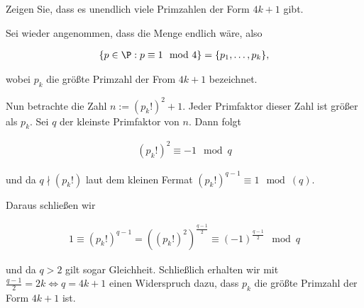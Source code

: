 
\begin{exercise}

Zeigen Sie, dass es unendlich viele Primzahlen der Form $4k+1$ gibt.

\end{exercise}


\begin{solution}

Sei wieder angenommen, dass die Menge endlich wäre, also

\begin{align*}
    \{p \in \P: p \equiv 1 \mod{4}\} = \{p_1,\dots,p_k\},
\end{align*}

wobei $p_k$ die größte Primzahl der From $4k+1$ bezeichnet.

Nun betrachte die Zahl $n := (p_k!)^2 + 1$. Jeder Primfaktor dieser Zahl ist
größer als $p_k$. Sei $q$ der kleinste Primfaktor von $n$. Dann folgt

\begin{align*}
    (p_k!)^2 \equiv -1 \mod{q}
\end{align*}

und da $q \nmid (p_k!)$ laut dem kleinen Fermat $(p_k!)^{q-1} \equiv 1 \mod(q)$.

Daraus schließen wir

\begin{align*}
    1 \equiv (p_k!)^{q-1} = ((p_k!)^2)^{\frac{q-1}{2}} \equiv (-1)^{\frac{q-1}{2}} \mod{q}
\end{align*}

und da $q > 2$ gilt sogar Gleichheit. 
Schließlich erhalten wir mit $\frac{q-1}{2} = 2k \iff q = 4k + 1$ einen Widerspruch
dazu, dass $p_k$ die größte Primzahl der Form $4k+1$ ist.

\end{solution}

